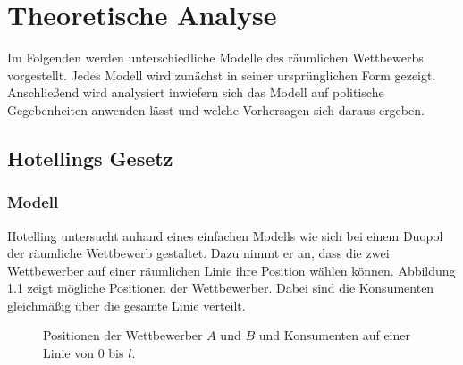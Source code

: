 \chapter{Theoretische Analyse}\label{Kap-Theorie}

\noindent
Im Folgenden werden unterschiedliche Modelle des räumlichen Wettbewerbs vorgestellt. Jedes Modell wird zunächst in seiner ursprünglichen Form gezeigt. Anschließend wird analysiert inwiefern sich das Modell auf politische Gegebenheiten anwenden lässt und welche Vorhersagen sich daraus ergeben.

\section{Hotellings Gesetz}\label{Sec-Hotelling}

\subsection{Modell}\label{Sec-Hotelling-Modell}

Hotelling \citep{hotelling1929} untersucht anhand eines einfachen Modells wie sich bei einem Duopol der räumliche Wettbewerb gestaltet. Dazu nimmt er an, dass die zwei Wettbewerber auf einer räumlichen Linie ihre Position wählen können. Abbildung \ref{Fig-Linearer-Wettbewerb} zeigt mögliche Positionen der Wettbewerber. Dabei sind die Konsumenten gleichmäßig über die gesamte Linie verteilt.

\begin{figure}[htb]
	\centering
	\caption{Positionen der Wettbewerber $A$ und $B$ und Konsumenten auf einer Linie von $0$ bis $l$.}
	\label{Fig-Linearer-Wettbewerb}
\end{figure}

